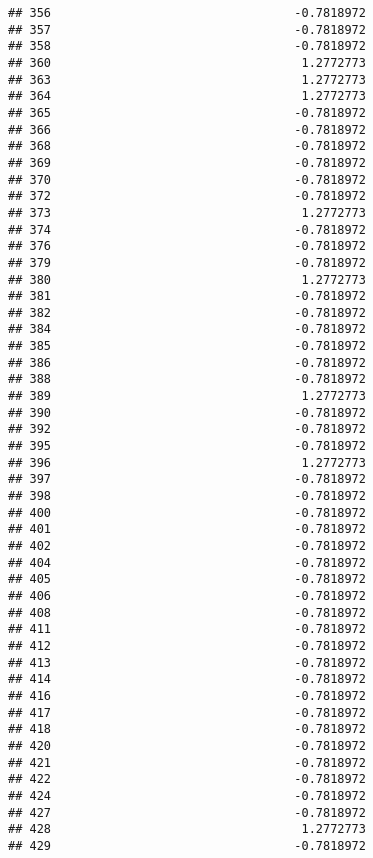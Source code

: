 \documentclass[
]{article}
\begin{document}
\begin{verbatim}
## 356                                  -0.7818972
## 357                                  -0.7818972
## 358                                  -0.7818972
## 360                                   1.2772773
## 363                                   1.2772773
## 364                                   1.2772773
## 365                                  -0.7818972
## 366                                  -0.7818972
## 368                                  -0.7818972
## 369                                  -0.7818972
## 370                                  -0.7818972
## 372                                  -0.7818972
## 373                                   1.2772773
## 374                                  -0.7818972
## 376                                  -0.7818972
## 379                                  -0.7818972
## 380                                   1.2772773
## 381                                  -0.7818972
## 382                                  -0.7818972
## 384                                  -0.7818972
## 385                                  -0.7818972
## 386                                  -0.7818972
## 388                                  -0.7818972
## 389                                   1.2772773
## 390                                  -0.7818972
## 392                                  -0.7818972
## 395                                  -0.7818972
## 396                                   1.2772773
## 397                                  -0.7818972
## 398                                  -0.7818972
## 400                                  -0.7818972
## 401                                  -0.7818972
## 402                                  -0.7818972
## 404                                  -0.7818972
## 405                                  -0.7818972
## 406                                  -0.7818972
## 408                                  -0.7818972
## 411                                  -0.7818972
## 412                                  -0.7818972
## 413                                  -0.7818972
## 414                                  -0.7818972
## 416                                  -0.7818972
## 417                                  -0.7818972
## 418                                  -0.7818972
## 420                                  -0.7818972
## 421                                  -0.7818972
## 422                                  -0.7818972
## 424                                  -0.7818972
## 427                                  -0.7818972
## 428                                   1.2772773
## 429                                  -0.7818972

\end{verbatim}
\end{document}
